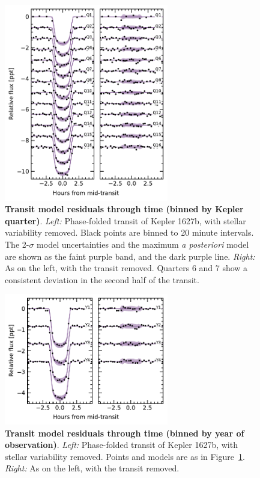 \documentclass[12pt,modern,twocolumn,tighten]{aastex63}
\begin{document}
\begin{figure}[t]
	\begin{center}
		\leavevmode
		\includegraphics[width=0.64\textwidth]{f7.pdf}
	\end{center}
	\vspace{-0.7cm}
	\caption{
		{\bf Transit model residuals through time (binned by Kepler quarter)}.  
    {\it Left:}
    Phase-folded transit of Kepler 1627b, with stellar variability
    removed.  Black points are binned to 20
    minute intervals.  The 2-$\sigma$ model uncertainties and the
    maximum {\it a posteriori} model are shown as the faint purple
    band, and the dark purple line.
    {\it Right:}
    As on the left, with the transit removed.  Quarters 6 and 7 show a
    consistent deviation in the second half of the transit.
		\label{fig:phasequarter}
	}
\end{figure}

\begin{figure}[t]
	\begin{center}
		\leavevmode
		\includegraphics[width=0.64\textwidth]{f8.pdf}
	\end{center}
	\vspace{-0.7cm}
	\caption{
    {\bf Transit model residuals through time (binned by year of observation)}.  
    {\it Left:}
    Phase-folded transit of Kepler 1627b, with stellar variability
    removed.  Points and models are as
    in Figure~\ref{fig:phasequarter}.
    {\it Right:}
    As on the left, with the transit removed.
		\label{fig:phaseyear}
	}
\end{figure}
\end{document}
